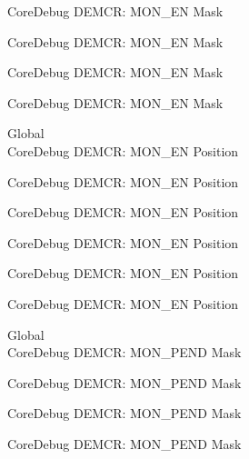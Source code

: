 \begin{DoxyRefList}
\label{deprecated__deprecated000340}%
%
Core\+Debug DEMCR\+: MON\+\_\+\+EN Mask 

\label{deprecated__deprecated000416}%
%
Core\+Debug DEMCR\+: MON\+\_\+\+EN Mask 

\label{deprecated__deprecated000505}%
%
Core\+Debug DEMCR\+: MON\+\_\+\+EN Mask 

\label{deprecated__deprecated000607}%
%
Core\+Debug DEMCR\+: MON\+\_\+\+EN Mask  
\item[Global \doxylink{group___c_m_s_i_s___core_debug_ga802829678f6871863ae9ecf60a10425c}{Core\+Debug\+\_\+\+DEMCR\+\_\+\+MON\+\_\+\+EN\+\_\+\+Pos} ]\hfill \\
\label{deprecated__deprecated000053}%
%
Core\+Debug DEMCR\+: MON\+\_\+\+EN Position 

\label{deprecated__deprecated000197}%
%
Core\+Debug DEMCR\+: MON\+\_\+\+EN Position 

\label{deprecated__deprecated000339}%
%
Core\+Debug DEMCR\+: MON\+\_\+\+EN Position 

\label{deprecated__deprecated000415}%
%
Core\+Debug DEMCR\+: MON\+\_\+\+EN Position 

\label{deprecated__deprecated000504}%
%
Core\+Debug DEMCR\+: MON\+\_\+\+EN Position 

\label{deprecated__deprecated000606}%
%
Core\+Debug DEMCR\+: MON\+\_\+\+EN Position  
\item[Global \doxylink{group___c_m_s_i_s___core_debug_ga68ec55930269fab78e733dcfa32392f8}{Core\+Debug\+\_\+\+DEMCR\+\_\+\+MON\+\_\+\+PEND\+\_\+\+Msk} ]\hfill \\
\label{deprecated__deprecated000052}%
%
Core\+Debug DEMCR\+: MON\+\_\+\+PEND Mask 

\label{deprecated__deprecated000196}%
%
Core\+Debug DEMCR\+: MON\+\_\+\+PEND Mask 

\label{deprecated__deprecated000338}%
%
Core\+Debug DEMCR\+: MON\+\_\+\+PEND Mask 

\label{deprecated__deprecated000414}%
%
Core\+Debug DEMCR\+: MON\+\_\+\+PEND Mask 


\end{DoxyRefList}
